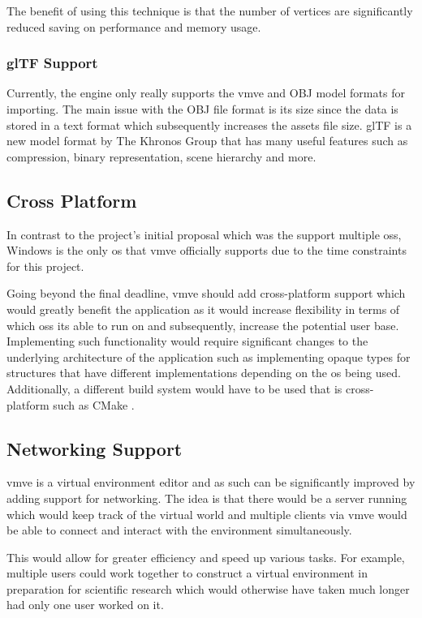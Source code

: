 \documentclass[11pt]{article}
\begin{document}
The benefit of using this technique is that the number of vertices are
significantly reduced saving on performance and memory usage.


\subsubsection{glTF Support}
Currently, the engine only really supports the \gls{vmve} and OBJ model formats for
importing. The main issue with the OBJ file format is its size since the data is
stored in a text format which subsequently increases the assets file size. glTF
\cite{gltf} is a new model format by The Khronos Group that has many useful
features such as compression, binary representation, scene hierarchy and more.

\subsection{Cross Platform}
In contrast to the project's initial proposal which was the support multiple
\glspl{os}, Windows is the only \gls{os} that \gls{vmve} officially supports due
to the time constraints for this project. 

Going beyond the final deadline, \gls{vmve} should add cross-platform support
which would greatly benefit the application as it would increase flexibility in
terms of which \glspl{os} its able to run on and subsequently, increase the
potential user base. Implementing such functionality would require significant
changes to the underlying architecture of the application such as implementing
opaque types for structures that have different implementations depending on the
\gls{os} being used. Additionally, a different build system would have to be
used that is cross-platform such as CMake \cite{cmake}.

\subsection{Networking Support}
\gls{vmve} is a virtual environment editor and as such can be significantly
improved by adding support for networking. The idea is that there would be a
server running which would keep track of the virtual world and multiple clients
via \gls{vmve} would be able to connect and interact with the environment
simultaneously.

This would allow for greater efficiency and speed up various tasks. For example,
multiple users could work together to construct a virtual environment in
preparation for scientific research which would otherwise have taken much longer
had only one user worked on it.
\end{document}
